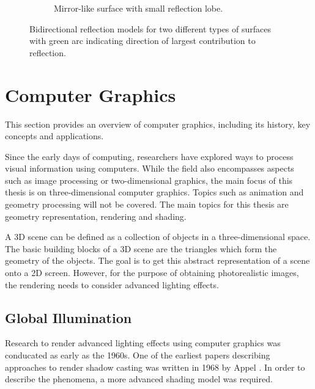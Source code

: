 \begin{figure}[H]
\begin{subfigure}[t]{0.45\textwidth}
    \caption{Mirror-like surface with small reflection lobe.}
    \label{fig:reflection-lobe-intro-specular}
  \end{subfigure}
  \caption{Bidirectional reflection models for two different types of surfaces with green arc indicating direction of largest contribution to reflection.}
  \label{fig:reflection-lobe-intro}
\end{figure}

\section{Computer Graphics}
\label{ch:computerGraphics}

This section provides an overview of computer graphics, including its history, key concepts and applications.

Since the early days of computing, researchers have explored ways to process visual information using computers. While the field also encompasses aspects such as image processing or two-dimensional graphics, the main focus of this thesis is on three-dimensional computer graphics. Topics such as animation and geometry processing will not be covered. The main topics for this thesis are geometry representation, rendering and shading.

A 3D scene can be defined as a collection of objects in a three-dimensional space. The basic building blocks of a 3D scene are the triangles which form the geometry of the objects. The goal is to get this abstract representation of a scene onto a 2D screen. However, for the purpose of obtaining photorealistic images, the rendering needs to consider advanced lighting effects.

\subsection{Global Illumination}

Research to render advanced lighting effects using computer graphics was conducated as early as the 1960s. One of the earliest papers describing approaches to render shadow casting was written in 1968 by Appel \cite{appel1968shading}. In order to describe the phenomena, a more advanced shading model was required.

